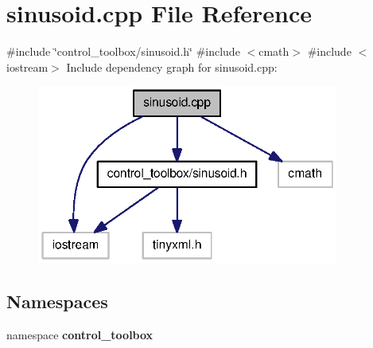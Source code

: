 \section{sinusoid.\-cpp \-File \-Reference}
\label{sinusoid_8cpp}
{\ttfamily \#include \char`\"{}control\-\_\-toolbox/sinusoid.\-h\char`\"{}}\*
{\ttfamily \#include $<$cmath$>$}\*
{\ttfamily \#include $<$iostream$>$}\*
\-Include dependency graph for sinusoid.\-cpp\-:
\nopagebreak
\begin{figure}[H]
\begin{center}
\leavevmode
\includegraphics[width=281pt]{sinusoid_8cpp__incl}
\end{center}
\end{figure}
\subsection*{\-Namespaces}
\begin{DoxyCompactItemize}
\item 
namespace {\bf control\-\_\-toolbox}
\end{DoxyCompactItemize}
